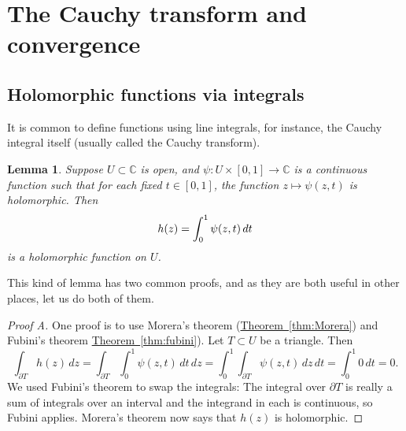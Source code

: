\documentclass[12pt,openany]{book}
\newcommand{\avoidbreak}{\postdisplaypenalty=100}
\newcommand{\C}{{\mathbb{C}}}
\theoremstyle{plain}
\newtheorem{lemma}[thm]{Lemma}
\theoremstyle{remark}
\theoremstyle{definition}
\theoremstyle{exercise}
\theoremstyle{example}
\newcommand{\thmref}[1]{\hyperref[#1]{Theorem~\ref*{#1}}}
\begin{document}

\section{The Cauchy transform and convergence}

\subsection{Holomorphic functions via integrals}

It is common to define functions using line integrals, for instance,
the Cauchy integral itself (usually called the Cauchy transform).

\begin{lemma} \label{lemma:holfuncbyintegral}
Suppose $U \subset \C$ is open, and
$\psi \colon U \times [0,1] \to \C$ is a continuous function such that
for each fixed $t \in [0,1]$, the function $z \mapsto \psi(z,t)$ is
holomorphic.  Then
\begin{equation*}
h(z) =
\int_0^1 \psi(z,t) \, dt
\avoidbreak
\end{equation*}
is a holomorphic function on $U$.
\end{lemma}

This kind of lemma has two common proofs,
and as they are both useful in other places, let us do both of them.

\begin{proof}[Proof A]
One proof is to use Morera's theorem (\thmref{thm:Morera}) and
Fubini's theorem \thmref{thm:fubini}).
Let $T \subset U$ be a triangle.  Then
\begin{equation*}
\int_{\partial T}
h(z)
\, dz
=
\int_{\partial T}
\int_0^1 \psi(z,t) \, dt
\, dz
=
\int_0^1
\int_{\partial T}
\psi(z,t)
\, dz
\, dt
= \int_0^1 0 \, dt = 0.
\end{equation*}
We used Fubini's theorem to swap the integrals:
The integral over $\partial T$ is really a sum of integrals over an interval
and the integrand in each is continuous, so Fubini applies.
Morera's theorem now says that $h(z)$ is
holomorphic.
\end{proof}
\end{document}
